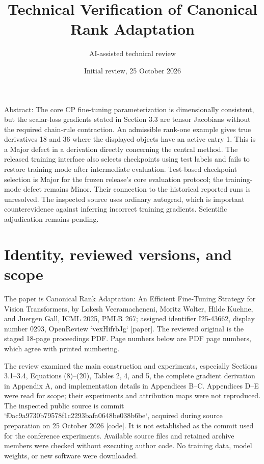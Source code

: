 \documentclass[10pt]{article}
\title{Technical Verification of
Canonical Rank Adaptation}
\author{AI-assisted technical review}
\date{Initial review, 25 October 2026}
\begin{document}
\maketitle
Abstract: The core CP fine-tuning parameterization is dimensionally consistent, but the scalar-loss gradients stated in Section 3.3 are tensor Jacobians without the required chain-rule contraction. An admissible rank-one example gives true derivatives 18 and 36 where the displayed objects have an active entry 1. This is a Major defect in a derivation directly concerning the central method. The released training interface also selects checkpoints using test labels and fails to restore training mode after intermediate evaluation. Test-based checkpoint selection is Major for the frozen release’s core evaluation protocol; the training-mode defect remains Minor. Their connection to the historical reported runs is unresolved. The inspected source uses ordinary autograd, which is important counterevidence against inferring incorrect training gradients. Scientific adjudication remains pending.\par
\section*{Identity, reviewed versions, and scope}
The paper is Canonical Rank Adaptation: An Efficient Fine-Tuning Strategy for Vision Transformers, by Lokesh Veeramacheneni, Moritz Wolter, Hilde Kuehne, and Juergen Gall, ICML 2025, PMLR 267; assigned identifier I25-43662, display number 0293, OpenReview `vexHifrbJg` [paper]. The reviewed original is the staged 18-page proceedings PDF. Page numbers below are PDF page numbers, which agree with printed numbering.\par
The review examined the main construction and experiments, especially Sections 3.1–3.4, Equations (8)–(20), Tables 2, 4, and 5, the complete gradient derivation in Appendix A, and implementation details in Appendices B–C. Appendices D–E were read for scope; their experiments and attribution maps were not reproduced. The inspected public source is commit `f0ac9a9730b79578f1c2293bafa0648be038b6be`, acquired during source preparation on 25 October 2026 [code]. It is not established as the commit used for the conference experiments. Available source files and retained archive members were checked without executing author code. No training data, model weights, or new software were downloaded.\par
\end{document}
